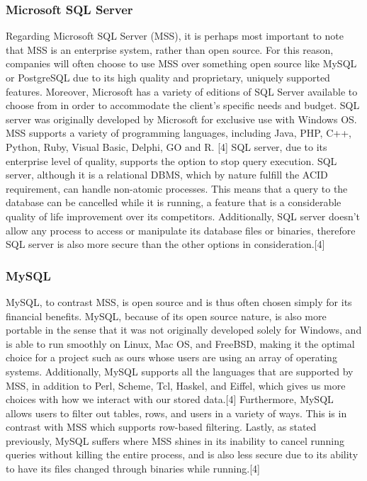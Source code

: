 \documentclass[onecolumn, draftclsnofoot,10pt, compsoc]{IEEEtran}
\begin{document}
\subsubsection{Microsoft SQL Server}
Regarding Microsoft SQL Server (MSS), it is perhaps most important to note that MSS is an enterprise system, rather than open source. For this reason, companies will often choose to use MSS over something open source like MySQL or PostgreSQL due to its high quality and proprietary, uniquely supported features. Moreover, Microsoft has a variety of editions of SQL Server available to choose from in order to accommodate the client's specific needs and budget. SQL server was originally developed by Microsoft for exclusive use with Windows OS. MSS supports a variety of programming languages, including Java, PHP, C++, Python, Ruby, Visual Basic, Delphi, GO and R. [4] SQL server, due to its enterprise level of quality, supports the option to stop query execution. SQL server, although it is a relational DBMS, which by nature fulfill the ACID requirement, can handle non-atomic processes. This means that a query to the database can be cancelled while it is running, a feature that is a considerable quality of life improvement over its competitors. Additionally, SQL server doesn't allow any process to access or manipulate its database files or binaries, therefore SQL server is also more secure than the other options in consideration.[4]

\subsubsection{MySQL}
MySQL, to contrast MSS, is open source and is thus often chosen simply for its financial benefits. MySQL, because of its open source nature, is also more portable in the sense that it was not originally developed solely for Windows, and is able to run smoothly on Linux, Mac OS, and FreeBSD, making it the optimal choice for a project such as ours whose users are using an array of operating systems. Additionally, MySQL supports all the languages that are supported by MSS, in addition to Perl, Scheme, Tcl, Haskel, and Eiffel, which gives us more choices with how we interact with our stored data.[4] Furthermore, MySQL allows users to filter out tables, rows, and users in a variety of ways. This is in contrast with MSS which supports row-based filtering. Lastly, as stated previously, MySQL suffers where MSS shines in its inability to cancel running queries without killing the entire process, and is also less secure due to its ability to have its files changed through binaries while running.[4]
\end{document}
